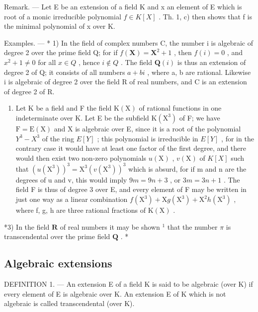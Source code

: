 Remark. --- Let E be an extension of a field K and x an element of E which is root of a monic irreducible polynomial \(f \in K[X]\) . Th. 1, c) then shows that f is the minimal polynomial of x over K.

Examples. --- * 1) In the field of complex numbers C, the number i is algebraic of degree 2 over the prime field Q; for if \(f(\mathbf{X}) = \mathbf{X}^{2} + 1\) , then \(f(i) = 0\) , and \(x^{2} + 1 \neq 0\) for all \(x \in Q\) , hence \(i \notin Q\) . The field \(\mathbf{Q}(i)\) is thus an extension of degree 2 of Q; it consists of all numbers \(a + bi\) , where a, b are rational. Likewise i is algebraic of degree 2 over the field R of real numbers, and C is an extension of degree 2 of R.

\begin{enumerate}
\def\labelenumi{\arabic{enumi})}
\setcounter{enumi}{1}
\tightlist
\item
  Let K be a field and F the field \(\mathrm{K}(\mathrm{X})\) of rational functions in one indeterminate over K. Let E be the subfield \(\mathrm{K}(\mathrm{X}^{3})\) of F; we have \(\mathrm{F} = \mathrm{E}(\mathrm{X})\) and X is algebraic over E, since it is a root of the polynomial \(Y^{3} - X^{3}\) of the ring \(E[Y]\) ; this polynomial is irreducible in \(E[Y]\) , for in the contrary case it would have at least one factor of the first degree, and there would then exist two non-zero polynomials \(u(\mathrm{X})\) , \(v(\mathrm{X})\) of \(K[X]\) such that \((u(\mathrm{X}^{3}))^{3} = \mathrm{X}^{3}(v(\mathrm{X}^{3}))^{3}\) which is absurd, for if m and n are the degrees of u and v, this would imply \(9m = 9n + 3\) , or \(3m = 3n + 1\) . The field F is thus of degree 3 over E, and every element of F may be written in just one way as a linear combination \(f(\mathrm{X}^{3}) + \mathrm{X}g(\mathrm{X}^{3}) + \mathrm{X}^{2}h(\mathrm{X}^{3})\) , where f, g, h are three rational fractions of \(\mathrm{K}(\mathrm{X})\) .
\end{enumerate}

*3) In the field \(\mathbf{R}\) of real numbers it may be shown \(^1\) that the number \(\pi\) is transcendental over the prime field \(\mathbf{Q}\) . *

\subsection{Algebraic extensions}

DEFINITION 1. --- An extension E of a field K is said to be algebraic (over K) if every element of E is algebraic over K. An extension E of K which is not algebraic is called transcendental (over K).

